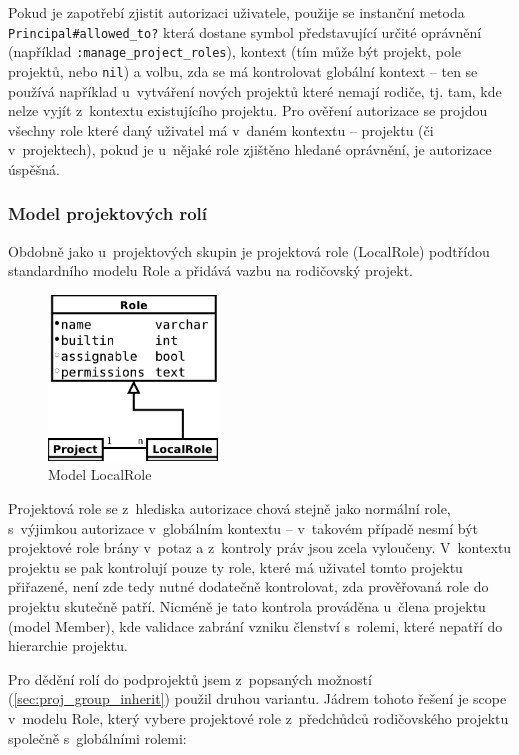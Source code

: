 \documentclass[thesis=B,czech]{FITthesis}[2012/05/02]
\begin{document}
Pokud je zapotřebí zjistit autorizaci uživatele, použije se instanční
metoda \lstinline!Principal#allowed_to?! která dostane symbol
představující určité oprávnění (například
\lstinline!:manage_project_roles!), kontext (tím může být projekt, pole
projektů, nebo \lstinline!nil!) a volbu, zda se má kontrolovat globální
kontext -- ten se používá například u~vytváření nových projektů které
nemají rodiče, tj. tam, kde nelze vyjít z~kontextu existujícího
projektu. Pro ověření autorizace se projdou všechny role které daný
uživatel má v~daném kontextu -- projektu (či v~projektech), pokud je
u~nějaké role zjištěno hledané oprávnění, je autorizace úspěšná.

\subsubsection{Model projektových rolí}

Obdobně jako u~projektových skupin je projektová role (LocalRole)
podtřídou standardního modelu Role a přidává vazbu na rodičovský
projekt.

\begin{figure}[htbp]
\centering
\includegraphics[width=0.4\textwidth]{role-er1.pdf}
\caption{Model LocalRole}
\end{figure}

Projektová role se z~hlediska autorizace chová stejně jako normální
role, s~výjimkou autorizace v~globálním kontextu -- v~takovém případě
nesmí být projektové role brány v~potaz a z~kontroly práv jsou zcela
vyloučeny. V~kontextu projektu se pak kontrolují pouze ty role, které má
uživatel tomto projektu přiřazené, není zde tedy nutné dodatečně
kontrolovat, zda prověřovaná role do projektu skutečně patří. Nicméně je
tato kontrola prováděna u~člena projektu (model Member), kde validace
zabrání vzniku členství s~rolemi, které nepatří do hierarchie projektu.

Pro dědění rolí do podprojektů jsem z~popsaných možností
(\ref{sec:proj_group_inherit}) použil druhou variantu. Jádrem tohoto
řešení je \gls{scope} v~modelu Role, který vybere projektové role
z~předchůdců rodičovského projektu společně s~globálními rolemi:
\end{document}
